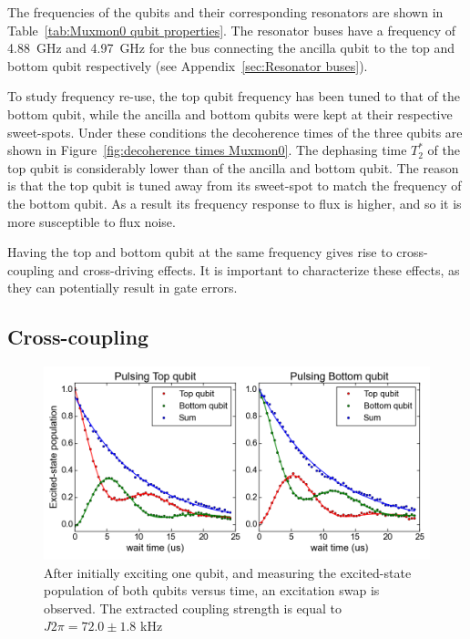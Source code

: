       The frequencies of the qubits and their corresponding resonators are shown in Table~\ref{tab:Muxmon0 qubit properties}. The resonator buses have a frequency of \SI{4.88}{\giga \hertz} and \SI{4.97}{\giga \hertz} for the bus connecting the ancilla qubit to the top and bottom qubit respectively (see Appendix~\ref{sec:Resonator buses}).

      To study frequency re-use, the top qubit frequency has been tuned to that of the bottom qubit, while the ancilla and bottom qubits were kept at their respective sweet-spots. Under these conditions the decoherence times of the three qubits are shown in Figure~\ref{fig:decoherence times Muxmon0}. The dephasing time $T_2^*$ of the top qubit is considerably lower than of the ancilla and bottom qubit. The reason is that the top qubit is tuned away from its sweet-spot to match the frequency of the bottom qubit. As a result its frequency response to flux is higher, and so it is more susceptible to flux noise.

      Having the top and bottom qubit at the same frequency gives rise to cross-coupling and cross-driving effects. It is important to characterize these effects, as they can potentially result in gate errors.

    \subsection{Cross-coupling}
      \label{ssec:cross-coupling}
      \begin{figure}[tb]
        \centering
        \includegraphics[width=\linewidth]{../Figures/Exploring frequency re-use/excitation_swap.png}
        \caption{After initially exciting one qubit, and measuring the excited-state population of both qubits versus time, an excitation swap is observed. The extracted coupling strength is equal to $J2\pi=72.0 \pm 1.8$ kHz}
        \label{fig:excitation swap}
      \end{figure}

